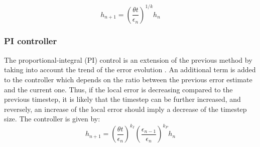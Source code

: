 \begin{equation}
    \label{eq:ELEController}
    h_{n+1} = \left(\frac{\theta t}{\epsilon_n}\right)^{1/k}h_n
\end{equation}

\subsubsection{PI controller}
The proportional-integral (PI) control is an extension of the previous method by taking into account the trend of the error evolution \cite{AutomControlAdaptTS}. An additional term is added to the controller which depends on the ratio between the previous error estimate and the current one. Thus, if the local error is decreasing compared to the previous timestep, it is likely that the timestep can be further increased, and reversely, an increase of the local error should imply a decrease of the timestep size. The controller is given by:
\begin{equation}
h_{n+1} = \left(\frac{\theta t}{\epsilon_n}\right)^{k_I} \left(\frac{\epsilon_{n-1}}{\epsilon_n}\right)^{k_P} h_n 
\end{equation}

